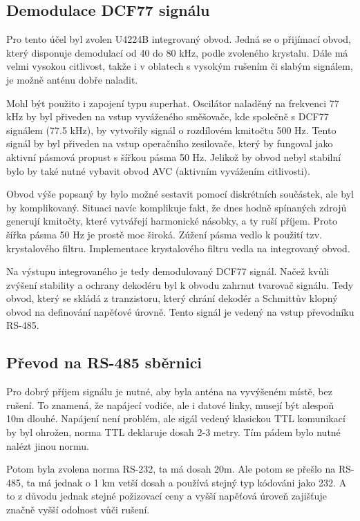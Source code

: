 \subsection{Demodulace DCF77 signálu}
    Pro tento účel byl zvolen U4224B integrovaný obvod. Jedná se o přijímací obvod, který
    disponuje demodulací od 40 do 80 kHz, podle zvoleného krystalu. Dále má velmi vysokou
    citlivost, takže i v oblatech s vysokým rušením či slabým signálem, je možně anténu
    dobře naladit.

    Mohl být použito i zapojení typu superhat. Oscilátor naladěný na frekvenci 77 kHz by
    byl přiveden na vstup vyváženého směšovače, kde společně s DCF77 signálem (77.5 kHz),
    by vytvořily signál o rozdílovém kmitočtu 500 Hz. Tento signál by byl přiveden na
    vstup operačního zesilovače, který by fungoval jako aktivní pásmová propust s šířkou
    pásma 50 Hz. Jelikož by obvod nebyl stabilní bylo by také nutné vybavit obvod AVC
    (aktivním vyvážením citlivosti).

    Obvod výše popsaný by bylo možné sestavit pomocí diskrétních součástek, ale byl by
    komplikovaný. Situaci navíc komplikuje fakt, že dnes hodně spínaných zdrojů generují
    kmitočty, které vytvářejí harmonické násobky, a ty ruší příjem. Proto šířka pásma 50
    Hz je prostě moc široká. Zúžení pásma vedlo k použití tzv. krystalového filtru.
    Implementace krystalového filtru vedla na integrovaný obvod.

    Na výstupu integrovaného je tedy demodulovaný DCF77 signál. Načež kvůli zvýšení
    stability a ochrany dekodéru byl k obvodu zahrnut tvarovač signálu. Tedy obvod, který
    se skládá z tranzistoru, který chrání dekodér a Schmittův klopný obvod na definování
    napěťové úrovně. Tento signál je vedený na vstup převodníku RS-485.

\subsection{Převod na RS-485 sběrnici}
    Pro dobrý příjem signálu je nutné, aby byla anténa na vyvýšeném místě, bez rušení.
    To znamená, že napájecí vodiče, ale i datové linky, musejí být alespoň 10m dlouhé.
    Napájení není problém, ale sigál vedený klasickou TTL komunikací by byl ohrožen,
    norma TTL deklaruje dosah 2-3 metry. Tím pádem bylo nutné nalézt jinou normu.

    Potom byla zvolena norma RS-232, ta má dosah 20m. Ale potom se přešlo na RS-485, ta má
    jednak o 1 km vetší dosah a používá stejný typ kódováni jako 232. A to z důvodu jednak
    stejné požizovací ceny a vyšší napěťová úroveň zajišťuje značně vyšší odolnost vůči
    rušení.

